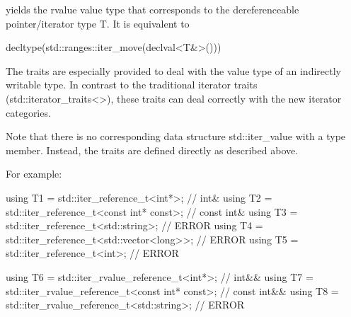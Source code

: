 yields the rvalue value type that corresponds to the dereferenceable pointer/iterator type T. It is equivalent to

\begin{cpp}
decltype(std::ranges::iter_move(declval<T&>()))
\end{cpp}

The traits are especially provided to deal with the value type of an indirectly writable type. In contrast to the traditional iterator traits (std::iterator\_traits<>), these traits can deal correctly with the new iterator categories.

Note that there is no corresponding data structure std::iter\_value with a type member. Instead, the traits are defined directly as described above.

For example:

\begin{cpp}
using T1 = std::iter_reference_t<int*>; // int&
using T2 = std::iter_reference_t<const int* const>; // const int&
using T3 = std::iter_reference_t<std::string>; // ERROR
using T4 = std::iter_reference_t<std::vector<long>>; // ERROR
using T5 = std::iter_reference_t<int>; // ERROR

using T6 = std::iter_rvalue_reference_t<int*>; // int&&
using T7 = std::iter_rvalue_reference_t<const int* const>; // const int&&
using T8 = std::iter_rvalue_reference_t<std::string>; // ERROR
\end{cpp}












